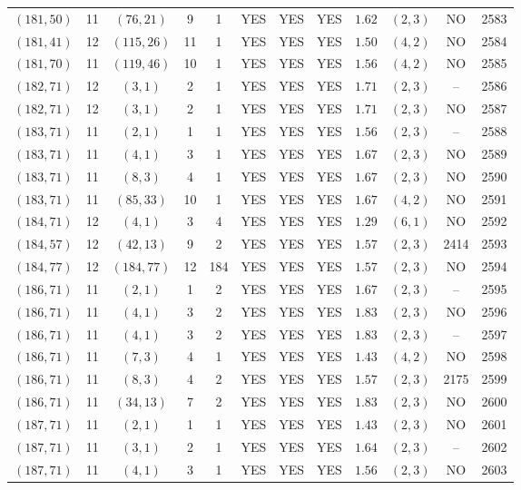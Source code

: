 \begin{longtable}{|c|c|c|c|c|c|c|c|c|c|c|c|}
$(181,50)$ & 11 & $(76,21)$ & 9 & 1 & YES & YES & YES & $1.62$ & $(2,3)$ & NO & 2583\\
$(181,41)$ & 12 & $(115,26)$ & 11 & 1 & YES & YES & YES & $1.50$ & $(4,2)$ & NO & 2584\\
$(181,70)$ & 11 & $(119,46)$ & 10 & 1 & YES & YES & YES & $1.56$ & $(4,2)$ & NO & 2585\\
$(182,71)$ & 12 & $(3,1)$ & 2 & 1 & YES & YES & YES & $1.71$ & $(2,3)$ & -- & 2586\\
$(182,71)$ & 12 & $(3,1)$ & 2 & 1 & YES & YES & YES & $1.71$ & $(2,3)$ & NO & 2587\\
$(183,71)$ & 11 & $(2,1)$ & 1 & 1 & YES & YES & YES & $1.56$ & $(2,3)$ & -- & 2588\\
$(183,71)$ & 11 & $(4,1)$ & 3 & 1 & YES & YES & YES & $1.67$ & $(2,3)$ & NO & 2589\\
$(183,71)$ & 11 & $(8,3)$ & 4 & 1 & YES & YES & YES & $1.67$ & $(2,3)$ & NO & 2590\\
$(183,71)$ & 11 & $(85,33)$ & 10 & 1 & YES & YES & YES & $1.67$ & $(4,2)$ & NO & 2591\\
$(184,71)$ & 12 & $(4,1)$ & 3 & 4 & YES & YES & YES & $1.29$ & $(6,1)$ & NO & 2592\\
$(184,57)$ & 12 & $(42,13)$ & 9 & 2 & YES & YES & YES & $1.57$ & $(2,3)$ & 2414 & 2593\\
$(184,77)$ & 12 & $(184,77)$ & 12 & 184 & YES & YES & YES & $1.57$ & $(2,3)$ & NO & 2594\\
$(186,71)$ & 11 & $(2,1)$ & 1 & 2 & YES & YES & YES & $1.67$ & $(2,3)$ & -- & 2595\\
$(186,71)$ & 11 & $(4,1)$ & 3 & 2 & YES & YES & YES & $1.83$ & $(2,3)$ & NO & 2596\\
$(186,71)$ & 11 & $(4,1)$ & 3 & 2 & YES & YES & YES & $1.83$ & $(2,3)$ & -- & 2597\\
$(186,71)$ & 11 & $(7,3)$ & 4 & 1 & YES & YES & YES & $1.43$ & $(4,2)$ & NO & 2598\\
$(186,71)$ & 11 & $(8,3)$ & 4 & 2 & YES & YES & YES & $1.57$ & $(2,3)$ & 2175 & 2599\\
$(186,71)$ & 11 & $(34,13)$ & 7 & 2 & YES & YES & YES & $1.83$ & $(2,3)$ & NO & 2600\\
$(187,71)$ & 11 & $(2,1)$ & 1 & 1 & YES & YES & YES & $1.43$ & $(2,3)$ & NO & 2601\\
$(187,71)$ & 11 & $(3,1)$ & 2 & 1 & YES & YES & YES & $1.64$ & $(2,3)$ & -- & 2602\\
$(187,71)$ & 11 & $(4,1)$ & 3 & 1 & YES & YES & YES & $1.56$ & $(2,3)$ & NO & 2603\\

\end{longtable}
